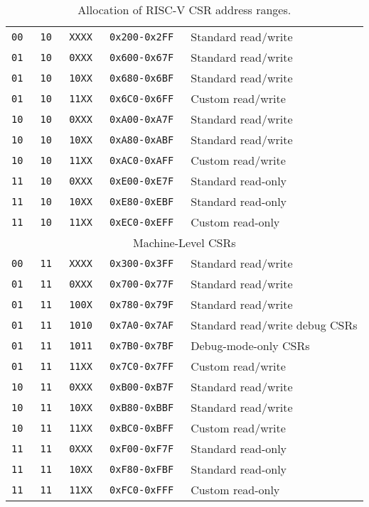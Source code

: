 \begin{table*}[h!]
\begin{center}
\begin{tabular}{|c|c|c|c|l|}
\hline
\tt   00   &\tt   10  &\tt   XXXX   & \tt 0x200-0x2FF & Standard read/write \\
\tt   01   &\tt   10  &\tt   0XXX   & \tt 0x600-0x67F & Standard read/write \\
\tt   01   &\tt   10  &\tt   10XX   & \tt 0x680-0x6BF & Standard read/write \\
\tt   01   &\tt   10  &\tt   11XX   & \tt 0x6C0-0x6FF & Custom read/write \\
\tt   10   &\tt   10  &\tt   0XXX   & \tt 0xA00-0xA7F & Standard read/write \\
\tt   10   &\tt   10  &\tt   10XX   & \tt 0xA80-0xABF & Standard read/write \\
\tt   10   &\tt   10  &\tt   11XX   & \tt 0xAC0-0xAFF & Custom read/write \\
\tt   11   &\tt   10  &\tt   0XXX   & \tt 0xE00-0xE7F & Standard read-only \\
\tt   11   &\tt   10  &\tt   10XX   & \tt 0xE80-0xEBF & Standard read-only \\
\tt   11   &\tt   10  &\tt   11XX   & \tt 0xEC0-0xEFF & Custom read-only \\
\hline
\multicolumn{5}{|c|}{Machine-Level CSRs}  \\
\hline
\tt   00   &\tt   11  &\tt   XXXX   & \tt 0x300-0x3FF & Standard read/write \\
\tt   01   &\tt   11  &\tt   0XXX   & \tt 0x700-0x77F & Standard read/write \\
\tt   01   &\tt   11  &\tt   100X   & \tt 0x780-0x79F & Standard read/write \\
\tt   01   &\tt   11  &\tt   1010   & \tt 0x7A0-0x7AF & Standard read/write debug CSRs  \\
\tt   01   &\tt   11  &\tt   1011   & \tt 0x7B0-0x7BF & Debug-mode-only CSRs \\
\tt   01   &\tt   11  &\tt   11XX   & \tt 0x7C0-0x7FF & Custom read/write \\
\tt   10   &\tt   11  &\tt   0XXX   & \tt 0xB00-0xB7F & Standard read/write \\
\tt   10   &\tt   11  &\tt   10XX   & \tt 0xB80-0xBBF & Standard read/write \\
\tt   10   &\tt   11  &\tt   11XX   & \tt 0xBC0-0xBFF & Custom read/write \\
\tt   11   &\tt   11  &\tt   0XXX   & \tt 0xF00-0xF7F & Standard read-only \\
\tt   11   &\tt   11  &\tt   10XX   & \tt 0xF80-0xFBF & Standard read-only \\
\tt   11   &\tt   11  &\tt   11XX   & \tt 0xFC0-0xFFF & Custom read-only \\
\hline
\end{tabular}
\end{center}
\caption{Allocation of RISC-V CSR address ranges.}
\label{csrrwpriv}
\end{table*}

